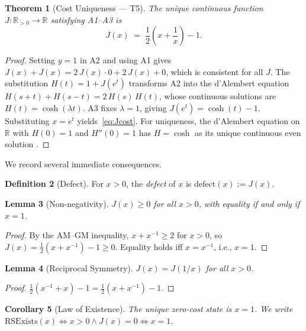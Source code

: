 \documentclass[12pt,a4paper]{article}
\newtheorem{theorem}{Theorem}[section]
\newtheorem{lemma}[theorem]{Lemma}
\newtheorem{corollary}[theorem]{Corollary}
\theoremstyle{definition}
\newtheorem{definition}[theorem]{Definition}
\theoremstyle{remark}
\begin{document}
\begin{theorem}[Cost Uniqueness --- T5]
\label{thm:cost-unique}
The unique continuous function $J : \mathbb{R}_{>0} \to \mathbb{R}$
satisfying \emph{A1--A3} is
\begin{equation}
  J(x) \;=\; \frac{1}{2}\!\left(x + \frac{1}{x}\right) - 1.
  \label{eq:Jcost}
\end{equation}
\end{theorem}

\begin{proof}
Setting $y = 1$ in A2 and using A1 gives $J(x) + J(x) = 2\,J(x)\cdot 0
+ 2\,J(x) + 0$, which is consistent for all $J$.  The substitution $H(t) =
1 + J(e^t)$ transforms A2 into the d'Alembert equation $H(s+t) + H(s-t) =
2\,H(s)\,H(t)$, whose continuous solutions are $H(t) = \cosh(\lambda t)$.
A3 fixes $\lambda = 1$, giving $J(e^t) = \cosh(t) - 1$.  Substituting
$x = e^t$ yields~\eqref{eq:Jcost}.  For uniqueness, the d'Alembert
equation on $\mathbb{R}$ with $H(0) = 1$ and $H''(0) = 1$ has
$H = \cosh$ as its unique continuous even solution
\cite{AczelDhombres1989}.
\end{proof}

We record several immediate consequences.

\begin{definition}[Defect]
\label{def:defect}
For $x > 0$, the \emph{defect} of $x$ is $\mathrm{defect}(x) := J(x)$.
\end{definition}

\begin{lemma}[Non-negativity]
\label{lem:nonneg}
$J(x) \geq 0$ for all $x > 0$, with equality if and only if $x = 1$.
\end{lemma}

\begin{proof}
By the AM--GM inequality, $x + x^{-1} \geq 2$ for $x > 0$, so
$J(x) = \tfrac{1}{2}(x + x^{-1}) - 1 \geq 0$.  Equality holds iff
$x = x^{-1}$, i.e., $x = 1$.
\end{proof}

\begin{lemma}[Reciprocal Symmetry]
\label{lem:recip}
$J(x) = J(1/x)$ for all $x > 0$.
\end{lemma}

\begin{proof}
$\tfrac{1}{2}(x^{-1} + x) - 1 = \tfrac{1}{2}(x + x^{-1}) - 1$.
\end{proof}

\begin{corollary}[Law of Existence]
\label{cor:existence}
The unique zero-cost state is $x = 1$.  We write $\mathrm{RSExists}(x)
\iff x > 0 \wedge J(x) = 0 \iff x = 1$.
\end{corollary}
\end{document}

